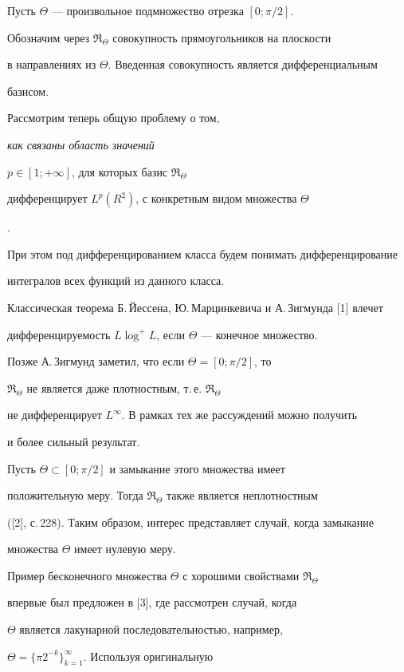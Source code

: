 Пусть $\Theta$ --- произвольное подмножество отрезка $[0;\pi / 2]$.


Обозначим через $\Re_{\Theta}$ совокупность прямоугольников на плоскости


в направлениях из $\Theta$. Введенная совокупность является дифференциальным


базисом.





Рассмотрим теперь общую проблему о том, {\it как связаны область значений


$p \in [ 1;+\infty]$, для которых базис $\Re_{\Theta}$


дифференцирует $L^p (R^2)$, с конкретным видом множества $\Theta$}.


При этом под дифференцированием класса будем понимать дифференцирование


интегралов всех функций из данного класса.





Классическая теорема Б.\,Йессена, Ю.\,Марцинкевича и А.\,Зигмунда [1] влечет


дифференцируемость $L\log^{+} L$, если $\Theta$ --- конечное множество.


Позже А.\,Зигмунд заметил, что если $\Theta= [ 0;\pi / 2]$, то


$\Re_{\Theta}$ не является даже плотностным, т.\,е. $\Re_{\Theta}$


не дифференцирует $L^{\infty}$. В рамках тех же рассуждений можно получить


и более сильный результат. {\it


Пусть $\Theta \subset [0;\pi/2]$ и замыкание этого множества имеет


положительную меру. Тогда $\Re_{\Theta}$ также является неплотностным}


([2], с.\,228). Таким образом, интерес представляет случай, когда замыкание


множества $\Theta$ имеет нулевую меру.





Пример бесконечного множества $\Theta$ с хорошими свойствами $\Re_{\Theta}$


впервые был предложен в [3], где рассмотрен случай, когда


$\Theta$ является лакунарной последовательностью, например,


$\Theta=\{\pi 2^{-k} \}_{k=1}^\infty$. Используя оригинальную


